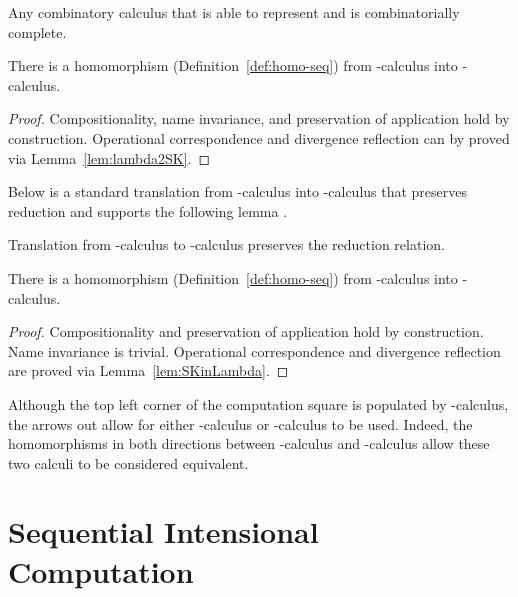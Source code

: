 \documentclass{llncs}
\begin{document}
\begin{lemma}
\label{lem:lambda2SK}
  Any combinatory calculus that is able to represent  and 
  is combinatorially complete.
\end{lemma}


\begin{theorem}
\label{thm:lambda2SK}
There is a homomorphism (Definition~\ref{def:homo-seq}) from -calculus into -calculus.
\end{theorem}
\begin{proof}
Compositionality, name invariance, and preservation of application hold by construction.
Operational correspondence and divergence reflection can by proved via Lemma~\ref{lem:lambda2SK}.
\end{proof}


Below is a standard translation from -calculus into -calculus that
preserves reduction and supports the following lemma \cite{Curry58combinatorylogic,Barendregt85}.




\begin{lemma}
\label{lem:SKinLambda}
Translation from -calculus to -calculus preserves the reduction relation.
\end{lemma}

\begin{theorem}
\label{thm:SK2lambda}
There is a homomorphism (Definition~\ref{def:homo-seq}) from -calculus into -calculus.
\end{theorem}
\begin{proof}Compositionality and preservation of application hold by construction. Name invariance is trivial.
Operational correspondence and divergence reflection are proved via Lemma~\ref{lem:SKinLambda}.
\end{proof}







Although the top left corner of the computation square is populated by -calculus, the arrows out allow for either -calculus or -calculus to be used.
Indeed, the homomorphisms in both directions between -calculus and -calculus allow these two calculi to be considered equivalent.


\section{Sequential Intensional Computation}
\label{sec:sic}
\end{document}
